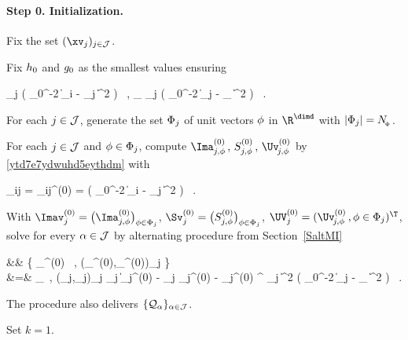 \paragraph{Step 0. Initialization.}
\begin{mylist}
\item
Fix the set \( (\xv_{j})_{j \in \JJJ} \).

\item
Fix \( h_{0} \) and \( g_{0} \) as the smallest values ensuring
\begin{EQA}[c]
	 \sum_{j \in \JJJ} 
	\sumi \Kern\bigl( \hiso_{0}^{-2} \| \Xv_{i} - \xv_{j} \|^{2} \bigr)
	\geq 
	\nmin
	\, ,
	\quad
	 \sum_{\jl \in \JJJ} 
	\sum_{j \in \JJJ} \Kern\bigl( \hisom_{0}^{-2} \| \xv_{j} - \xv_{\jl} \|^{2} \bigr)
	\geq 
	\nman
	\, .
\end{EQA}

\item
For each \( j \in \mathcal{J} \), generate the set \( \Phi_{j} \) of unit vectors \( \phi \) in \( \R^{\dimd} \)
with \( |\Phi_{j}| = N_{_{\! \Phi}} \).

\item 
For each \( j \in \mathcal{J} \) and \( \phi \in \Phi_{j} \), compute  
\( \Ima_{j,\sph}^{(0)} \, , \, S_{j,\sph}^{(0)} \, , \, \Uv_{\jm,\sph}^{(0)} \)
by \eqref{ytd7e7ydwuhd5eythdm} with 
\begin{EQA}[c]
	\weight_{ij} 
	= 
	\weight_{ij}^{(0)}
	= 
	\Kern\bigl( \hiso_{0}^{-2} \| \Xv_{i} - \xv_{j} \|^{2} \bigr) 
	\, .
\end{EQA}

\item 
With \( \Imav_{j}^{(0)} = \bigl( \Ima_{j,\sph}^{(0)} \bigr)_{\sph \in \Sph_{j}} \),
\( \Sv_{j}^{(0)} = \bigl( S_{j,\sph}^{(0)} \bigr)_{\sph \in \Sph_{j}} \),
\( \UV_{j}^{(0)} = (\Uv_{\jm,\sph}^{(0)} \, , \sph \in \Sph_{j})^{\T} \),
solve for every \( \alpha \in \mathcal{J} \) by alternating procedure from Section~\ref{SaltMI}
\begin{EQA}[rcl]
	&& \nquad
	\{ \PEDR_{\jl}^{(0)} \, , (\fcn_{\jjl}^{(0)},\fclv_{\jjl}^{(0)})_{j \in \JJJ} \} 
	\\
	&=& 
	\arginf_{\PEDR \, , (\fcn_{j},\fclv_{j})_{j \in \JJJ}} 
	\sum_{j \in \JJJ} 
	\bigl\| \Imav_{j}^{(0)} - \fcn_{j} \Sv_{j}^{(0)} - \UV_{j}^{(0)} \PEDR^{\T} \fclv_{j} \bigr\|^{2} \;
	\Kern\bigl( \hisom_{0}^{-2} \| \xv_{j} - \xv_{\jl} \|^{2} \bigr)
	\, .
	\qquad \quad
\label{kjhviir8786tytcdeef}
\end{EQA}
The procedure also delivers \( \{ \mathcal{Q}_{\alpha} \}_{\alpha \in \mathcal{J}} \).

\item 
Set \( k=1 \).
\end{mylist}


